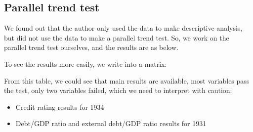 \subsection{Parallel trend test}
We found out that the author only used the data to make descriptive analysis, but did not
use the data to make a parallel trend test. So, we work on the parallel trend test ourselves, and the results are as below.

To see the results more easily, we write into a matrix:


From this table, we could see that main results are available, most variables pass the test,
only two variables failed, which we need to interpret with caution:
\begin{itemize}
    \item Credit rating results for 1934
    \item Debt/GDP ratio and external debt/GDP ratio results for 1931
\end{itemize}

